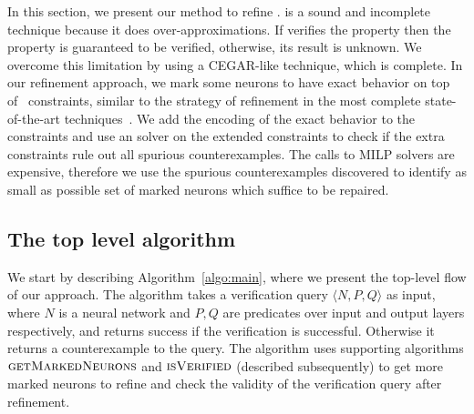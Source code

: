 In this section, we present our method to refine \deeppoly{}. \deeppoly{} is a sound and incomplete technique because it does over-approximations. If \deeppoly{} verifies the property then the property is guaranteed to be verified, otherwise, its result is unknown. We overcome this limitation by using a CEGAR-like technique, which is complete. In our refinement approach, we mark some \relu{} neurons to have exact behavior on top of~\deeppoly{} constraints, similar to the strategy of refinement in the most complete state-of-the-art techniques~\cite{wang2021beta,xu2020fast}. We add the encoding of the exact behavior to the~\deeppoly{} constraints and use an \milp{} solver on the extended constraints to check if the extra constraints rule out all spurious counterexamples. The calls to MILP solvers are expensive, therefore we use the spurious counterexamples discovered to identify as small as possible set of marked neurons which suffice to be repaired. %

\subsection{The top level algorithm}
\label{sec:toplevelalgo}
We start by describing Algorithm~\ref{algo:main}, where we present the top-level flow of our approach. 
The algorithm takes a verification query $\langle N,P,Q \rangle$ as input, where $N$ is a neural network and $P,Q$ are predicates over input and output layers respectively, and returns success if the verification is successful.
Otherwise it returns a counterexample to the query. The algorithm uses supporting algorithms $\textsc{getMarkedNeurons}$ and 
$\textsc{isVerified}$ (described subsequently) to get more marked neurons to refine and check the validity of the verification query  after refinement.


